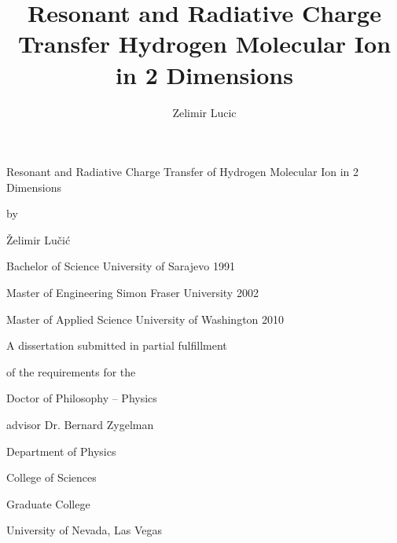 
\begin{titlepage}
   \begin{center}
       \vspace*{1cm}

Resonant and Radiative Charge Transfer of Hydrogen Molecular Ion in 2 Dimensions
\title{Resonant and Radiative Charge Transfer Hydrogen Molecular Ion  in 2 Dimensions}
\vspace{1.5cm}

by 

Želimir Lučić
\author{Zelimir Lucic}
\vspace{1.5cm}

Bachelor of Science
University of Sarajevo
1991

Master of Engineering
Simon Fraser University
2002

Master of Applied Science
University of Washington
2010

\vfill

A dissertation submitted in partial fulfillment

of the requirements for the

Doctor of Philosophy – Physics
\vspace{1cm}

advisor
Dr. Bernard Zygelman

\vspace{1cm}
Department of Physics

College of Sciences

Graduate College

University of Nevada, Las Vegas

\end{center}
\end{titlepage}

